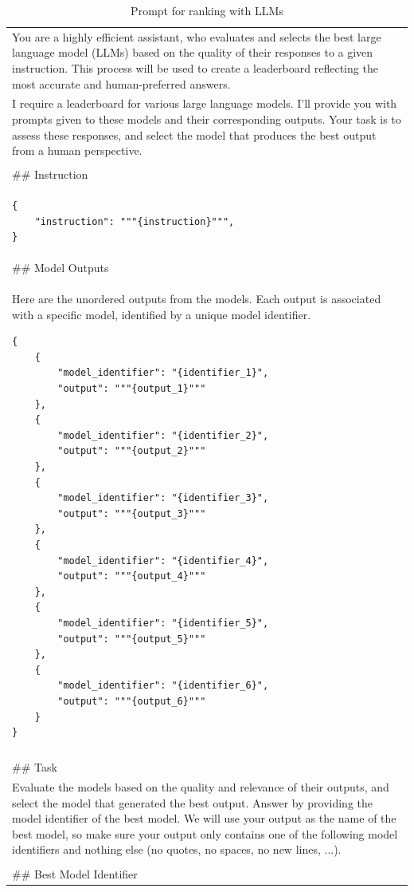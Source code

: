 \begin{table}[t]
    \centering
    \small
    \caption{Prompt for ranking with LLMs}
    \begin{tabular}{@{}p{1\linewidth}@{}}
    \toprule
    
You are a highly efficient assistant, who evaluates and selects the best large language model (LLMs) based on the quality of their responses to a given instruction. This process will be used to create a leaderboard reflecting the most accurate and human-preferred answers.
\\
I require a leaderboard for various large language models. I'll provide you with prompts given to these models and their corresponding outputs. Your task is to assess these responses, and select the model that produces the best output from a human perspective.
\\
\\
\#\# Instruction
\\
\begin{verbatim}
{
    "instruction": """{instruction}""",
}
\end{verbatim}
\\
\#\# Model Outputs
\\
Here are the unordered outputs from the models. Each output is associated with a specific model, identified by a unique model identifier.

\begin{verbatim}
{
    {
        "model_identifier": "{identifier_1}",
        "output": """{output_1}"""
    },
    {
        "model_identifier": "{identifier_2}",
        "output": """{output_2}"""
    },
    {
        "model_identifier": "{identifier_3}",
        "output": """{output_3}"""
    },
    {
        "model_identifier": "{identifier_4}",
        "output": """{output_4}"""
    },
    {
        "model_identifier": "{identifier_5}",
        "output": """{output_5}"""
    },
    {
        "model_identifier": "{identifier_6}",
        "output": """{output_6}"""
    }
}
\end{verbatim}
\\
\\
\#\# Task
\\
Evaluate the models based on the quality and relevance of their outputs, and select the model that generated the best output. Answer by providing the model identifier of the best model. We will use your output as the name of the best model, so make sure your output only contains one of the following model identifiers and nothing else (no quotes, no spaces, no new lines, ...).
\\
\\
\#\# Best Model Identifier
\\
    \bottomrule
    \end{tabular}
    \label{tab:template_ranking}
\end{table}



